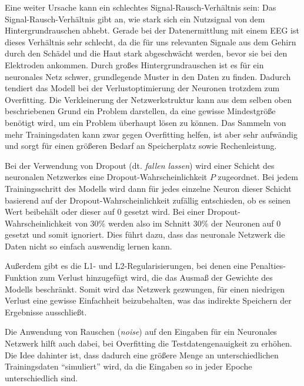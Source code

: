 \documentclass[10pt]{article}
\newcommand{\eng}[1]{\textit{#1}}
\begin{document}
Eine weiter Ursache kann ein schlechtes Signal-Rausch-Verhältnis sein:
Das Signal-Rausch-Verhältnis gibt an, wie stark sich ein Nutzsignal von dem Hintergrundrauschen abhebt. 
Gerade bei der Datenermittlung mit einem EEG ist dieses Verhältnis sehr schlecht, da die für uns relevanten Signale aus dem Gehirn durch den Schädel und die Haut stark abgeschwächt werden, bevor sie bei den Elektroden ankommen. 
Durch großes Hintergrundrauschen ist es für ein neuronales Netz schwer, grundlegende Muster in den Daten zu finden. 
Dadurch tendiert das Modell bei der Verlustoptimierung der Neuronen trotzdem zum Overfitting.
Die Verkleinerung der Netzwerkstruktur kann aus dem selben oben beschriebenen Grund ein Problem darstellen, da eine gewisse Mindestgröße benötigt wird, um ein Problem überhaupt lösen zu können.
Das Sammeln von mehr Trainingsdaten kann zwar gegen Overfitting helfen, ist aber sehr aufwändig und sorgt für einen größeren Bedarf an Speicherplatz sowie Rechenleistung.

Bei der Verwendung von Dropout (dt. \textit{fallen lassen}) wird einer Schicht des neuronalen Netzwerkes eine Dropout-Wahrscheinlichkeit $P$ zugeordnet.
Bei jedem Trainingsschritt des Modells wird dann für jedes einzelne Neuron dieser Schicht basierend auf der Dropout-Wahrscheinlichkeit zufällig entschieden, ob es seinen Wert beibehält oder dieser auf 0 gesetzt wird. 
Bei einer Dropout-Wahrscheinlichkeit von 30\% werden also im Schnitt 30\% der Neuronen auf 0 gesetzt und somit ignoriert.
Dies führt dazu, dass das neuronale Netzwerk die Daten nicht so einfach auswendig lernen kann.

Außerdem gibt es die L1- und L2-Regularisierungen, bei denen eine Penalties-Funktion zum Verlust hinzugefügt wird, die das Ausmaß der Gewichte des Modells beschränkt.
Somit wird das Netzwerk gezwungen, für einen niedrigen Verlust eine gewisse Einfachheit beizubehalten, was das indirekte Speichern der Ergebnisse ausschließt.

Die Anwendung von Rauschen (\eng{noise}) auf den Eingaben für ein Neuronales Netzwerk hilft auch dabei, bei Overfitting die Testdatengenauigkeit zu erhöhen.
Die Idee dahinter ist, dass dadurch eine größere Menge an unterschiedlichen Trainingsdaten \enquote{simuliert} wird, da die Eingaben so in jeder Epoche unterschiedlich sind.
\end{document}
